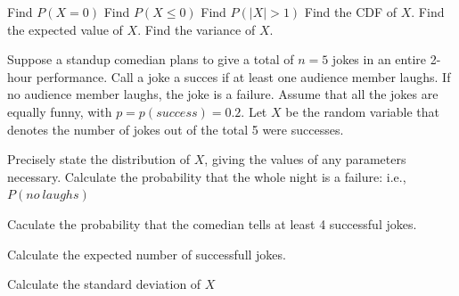 \documentclass[addpoints]{examsetup}
\begin{document}
\begin{questions}
      \begin{subparts}
            \subpart[2] Find $P(X = 0)$ \vspace{2.5cm}
            \subpart[2] Find $P(X \le 0)$ \vspace{2.5cm}
            \subpart[2] Find $P(\vert{X}\vert > 1)$ \vspace{2.5cm}
            \subpart[3] Find the CDF of $X$.\vspace{2.5cm}
            \subpart[3] Find the expected value of $X$.\vspace{2.5cm}
            \subpart[3] Find the variance of $X$.\vspace{2.5cm}
      \end{subparts}
\pagebreak      
\question
Suppose a standup comedian plans to give a total of $n= 5$ jokes in an entire 2-hour performance. Call a joke a succes if at least one audience member laughs. If no audience member laughs, the joke is a failure. Assume that all the jokes are equally funny, with $p= p(success)= 0.2$. Let $X$ be the random variable that denotes the number of jokes out of the total 5 were successes. 
\begin{subparts}
      \subpart[3] Precisely state the distribution of $X$, giving the values of any parameters necessary.\vspace{2cm}
      \subpart[3] Calculate the probability that the whole night is a failure: i.e., $P(no\ laughs)$\vspace{3cm}
      
      \subpart[3] Caculate the probability that the comedian tells at least 4 successful jokes.\vspace{3cm}
      
      \subpart[3] Calculate the expected number of successfull jokes. \vspace{2cm}
      
      \subpart[3] Calculate the standard deviation of $X$\vspace{2cm}


\end{subparts}
\pagebreak

\end{questions}
\end{document}
